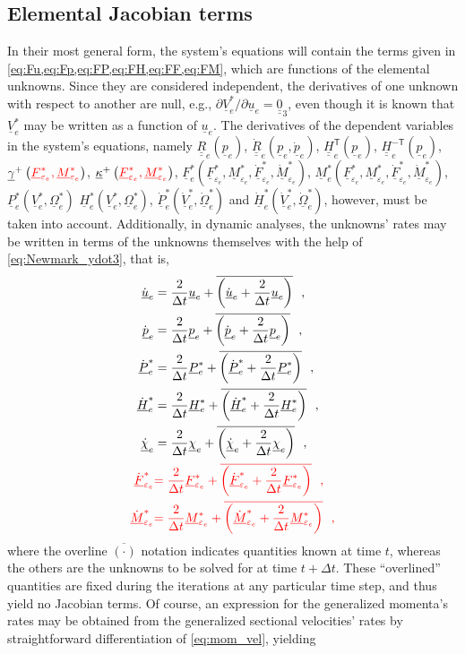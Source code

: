 \documentclass[12pt,a4paper,oneside,english]{abntex2} %
\newcommand{\fix}[1]{{\color{red}#1}}
\newcommand{\vect}[1]{\underline{#1}}
\def\tens#1{\underline{\underline{#1}}}
\def\lp{\left(}
\def\rp{\right)}
\def\T{\mathsf{T}}
\def\zthree{\tens{0}_3}
\def\R{\tens{R}}
\def\u{\vect{u}}
\def\udot{\dot{\u}}
\def\gam{\vect{\gamma}}
\def\gamp{\gam^{+}}
\def\kap{\vect{\kappa}}
\def\kapp{\kap^{+}}
\def\V{\vect{V}}
\def\Vs{\V^{*}}
\def\Om{\vect{\Omega}}
\def\Oms{\Om^{*}}
\def\P{\vect{P}}
\def\Ps{\P^*}
\def\Hv{\vect{H}}
\def\Hvs{\Hv^*}
\def\H{\tens{H}}
\def\p{\vect{p}}
\def\pdot{\dot{\p}}
\def\F{\vect{F}}
\def\Fs{\F^*}
\def\M{\vect{M}}
\def\Ms{\M^*}
\def\ue{\u_e}
\def\udote{\udot_e}
\def\pe{\p_e}
\def\pdote{\pdot_e}
\def\Vse{\Vs_e}
\def\Vsdote{\dot{\V}_e^*}
\def\Omse{\Oms_e}
\def\Omsdote{\dot{\Om}_e^*}
\def\Fse{\Fs_e}
\def\Mse{\Ms_e}
\def\Pse{\Ps_e}
\def\Pdotse{\dot{\P}_e^*}
\def\Hse{\Hvs_e}
\def\Hdotse{\dot{\Hv}_e^*}
\def\HTe{\H^\T_e}
\def\HinvTe{\H^{-\T}_e}
\def\Re{\R_{e}}
\def\Rdote{\dot{\R}_e}
\def\Fsepse{\F^*_{\varepsilon_e}}
\def\Msepse{\M^*_{\varepsilon_e}}
\def\Fsepsdote{\dot{\F}^*_{\varepsilon_e}}
\def\Msepsdote{\dot{\M}^*_{\varepsilon_e}}
\def\dt{\Delta t}
\def\todt{\frac{2}{\dt}}
\def\aerostates{\vect{\chi}_e}
\def\aerostatesrates{\vect{\dot{\chi}}_e}
\def\dt{\Delta t}
\begin{document}
\begin{apendicesenv}
\subsection{Elemental Jacobian terms}

In their most general form, the system's equations will contain the terms given in \cref{eq:Fu,eq:Fp,eq:FP,eq:FH,eq:FF,eq:FM}, which are functions of the elemental unknowns. Since they are considered independent, the derivatives of one unknown with respect to another are null, e.g., $\partial\Vse/\partial\ue = \zthree$, even though it is known that $\Vse$ may be written as a function of $\ue$. The derivatives of the dependent variables in the system's equations, namely $\Re(\pe)$, $\Rdote(\pe,\pdote)$, $\HTe(\pe)$, $\HinvTe(\pe)$, $\gamp\lp\fix{\Fsepse,\Msepse}\rp$, $\kapp\lp\fix{\Fsepse,\Msepse}\rp$, \fix{$\Fse\lp\Fsepse,\Msepse,\Fsepsdote,\Msepsdote\rp$, $\Mse\lp\Fsepse,\Msepse,\Fsepsdote,\Msepsdote\rp$,} $\Pse\lp\Vse,\Omse\rp$   $\Hse\lp\Vse,\Omse\rp$, $\Pdotse\lp\Vsdote,\Omsdote\rp$ and  $\Hdotse\lp\Vsdote,\Omsdote\rp$, however, must be taken into account. Additionally, in dynamic analyses, the unknowns' rates may be written in terms of the unknowns themselves with the help of \cref{eq:Newmark_ydot3}, that is,
\begin{equation}
\begin{aligned}
    \udote &= \todt\ue + \overline{\lp\udote+\todt\ue\rp}  \ \ ,
    \\
    \pdote &= \todt\pe + \overline{\lp\pdote+\todt\pe\rp}  \ \ ,
    \\
    \Pdotse &= \todt\Pse + \overline{\lp\Pdotse+\todt\Pse\rp} \ \ ,
    \\
    \Hdotse &= \todt\Hse +  \overline{\lp\Hdotse+\todt\Hse\rp} \ \ ,
    \\
    \aerostatesrates &= \todt\aerostates +  \overline{\lp\aerostatesrates+\todt\aerostates\rp} \ \ ,
    \\
    \fix{\Fsepsdote} &\fix{= \todt\Fsepse +  \overline{\lp\Fsepsdote+\todt\Fsepse\rp} \ \ ,}
    \\
    \fix{\Msepsdote} &\fix{= \todt\Msepse +  \overline{\lp\Msepsdote+\todt\Msepse\rp} \ \ ,}
    \label{eq:u_p_Psdot_Hdot_aerodot_e}
\end{aligned}
\end{equation}
where the overline $\overline{\lp\cdot\rp}$ notation indicates quantities known at time $t$, whereas the others are the unknowns to be solved for at time $t+\dt$.
These ``overlined'' quantities are fixed during the iterations at any particular time step, and thus yield no Jacobian terms. Of course, an expression for the generalized momenta's rates may be obtained from the generalized sectional velocities' rates by straightforward differentiation of \cref{eq:mom_vel}, yielding

\end{apendicesenv}
\end{document}
